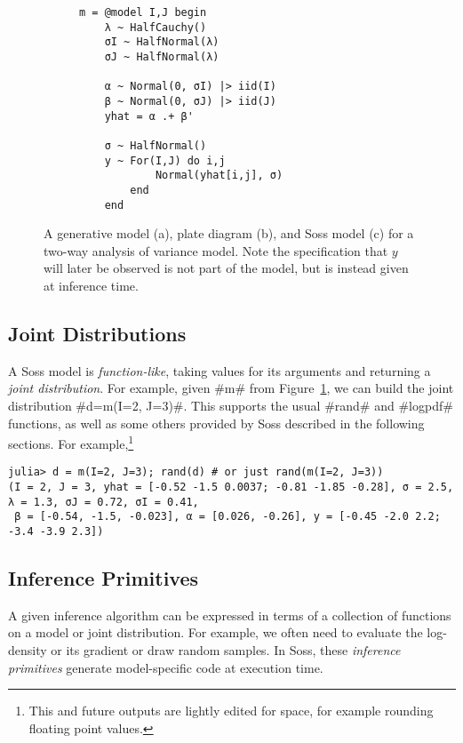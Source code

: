 \documentclass[anonymous=false, %
               format=acmsmall, %
               review=true, %
               screen=true, %
               nonacm=true]{acmart}
\begin{document}
\begin{figure}[t]
\begin{subfigure}[b]{0.3\textwidth}
    \begin{verbatim}
m = @model I,J begin
    λ ~ HalfCauchy()
    σI ~ HalfNormal(λ)
    σJ ~ HalfNormal(λ)
     
    α ~ Normal(0, σI) |> iid(I)
    β ~ Normal(0, σJ) |> iid(J)
    yhat = α .+ β'

    σ ~ HalfNormal()
    y ~ For(I,J) do i,j 
            Normal(yhat[i,j], σ)
        end
    end
    \end{verbatim} 
    \caption{}
    \end{subfigure}

    \caption{A generative model (a), plate diagram (b), and Soss model (c) for a two-way analysis of variance model. Note the specification that $y$ will later be observed is not part of the model, but is instead given at inference time.}
    \label{fig:model}
\end{figure}

\subsection{Joint Distributions}

A Soss model is \emph{function-like}, taking values for its arguments and returning a \emph{joint distribution}. For example, given \jl#m# from Figure~\ref{fig:model}, we can build the joint distribution \jl#d=m(I=2, J=3)#. This supports the usual \jl#rand# and \jl#logpdf# functions, as well as some others provided by Soss described in the following sections. For example,\footnote{This and future outputs are lightly edited for space, for example rounding floating point values.}

\begin{verbatim}
julia> d = m(I=2, J=3); rand(d) # or just rand(m(I=2, J=3))
(I = 2, J = 3, yhat = [-0.52 -1.5 0.0037; -0.81 -1.85 -0.28], σ = 2.5, λ = 1.3, σJ = 0.72, σI = 0.41, 
 β = [-0.54, -1.5, -0.023], α = [0.026, -0.26], y = [-0.45 -2.0 2.2; -3.4 -3.9 2.3])
\end{verbatim}

\subsection{Inference Primitives}

A given inference algorithm can be expressed in terms of a collection of functions on a model or joint distribution. For example, we often need to evaluate the log-density or its gradient  or draw random samples. In Soss, these \emph{inference primitives} generate model-specific code at execution time.
\end{document}
